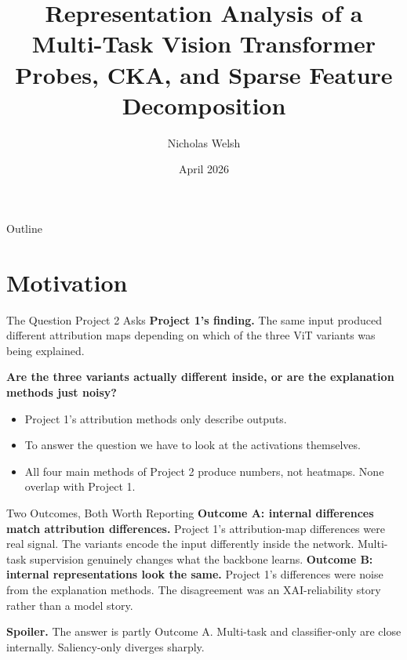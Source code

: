\documentclass{beamer}
\title[ViT Representation Analysis]{Representation Analysis of a Multi-Task Vision Transformer\\Probes, CKA, and Sparse Feature Decomposition}
\author[Welsh]{Nicholas Welsh}
\institute[FIT]{Florida Institute of Technology\\Department of Computer Science \& Mathematics}
\date{April 2026}
\begin{document}
\begin{frame}
  \titlepage
\end{frame}

\begin{frame}{Outline}
  \tableofcontents
\end{frame}

\section{Motivation}

\begin{frame}{The Question Project 2 Asks}
\textbf{Project 1's finding.} The same input produced different attribution maps depending on which of the three ViT variants was being explained.
\vfill
\begin{center}
\large \textbf{Are the three variants actually different inside, or are the explanation methods just noisy?}
\end{center}
\vfill
\small
\begin{itemize}\setlength\itemsep{2pt}
  \item Project 1's attribution methods only describe outputs.
  \item To answer the question we have to look at the activations themselves.
  \item All four main methods of Project 2 produce numbers, not heatmaps. None overlap with Project 1.
\end{itemize}
\end{frame}

\begin{frame}{Two Outcomes, Both Worth Reporting}
\small
\textbf{Outcome A: internal differences match attribution differences.} Project 1's attribution-map differences were real signal. The variants encode the input differently inside the network. Multi-task supervision genuinely changes what the backbone learns.
\vfill
\textbf{Outcome B: internal representations look the same.} Project 1's differences were noise from the explanation methods. The disagreement was an XAI-reliability story rather than a model story.
\vfill
\begin{center}
\textbf{Spoiler.} The answer is partly Outcome A. Multi-task and classifier-only are close internally. Saliency-only diverges sharply.
\end{center}
\end{frame}
\end{document}
